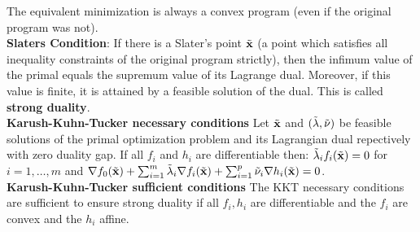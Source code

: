 The equivalent minimization is always a convex program (even if the original program was not). \\
\textbf{Slaters Condition}: If there is a Slater's point $\Tilde{\mathbf{x}}$ (a point which satisfies all inequality constraints of the original program strictly), then the infimum value of the primal equals the supremum value of its Lagrange dual. Moreover, if this value is finite, it is attained by a feasible solution of the dual. This is called \textbf{strong duality}. \\
\textbf{Karush-Kuhn-Tucker necessary conditions} Let $\Tilde{\mathbf{x}}$ and $(\Tilde{\mathbb{\lambda}}, \Tilde{\mathbb{\nu}})$ be feasible solutions of the primal optimization problem and its Lagrangian dual repectively with zero duality gap. If all $f_i$ and $h_i$ are differentiable then: $\Tilde{\lambda}_i f_i(\Tilde{\mathbf{x}}) = 0 $ for $i=1, \dots, m$ and $\nabla f_0(\Tilde{\mathbf{x}}) + \sum_{i=1}^m{\Tilde{\lambda}_i \nabla f_i(\Tilde{\mathbf{x}})} + \sum_{i=1}^p{\Tilde{\nu}_i \nabla h_i(\Tilde{\mathbf{x}})} = 0$. \\
\textbf{Karush-Kuhn-Tucker sufficient conditions} The KKT necessary conditions are sufficient to ensure strong duality if all $f_i, h_i$ are differentiable and the $f_i$ are convex and the $h_i$ affine.
